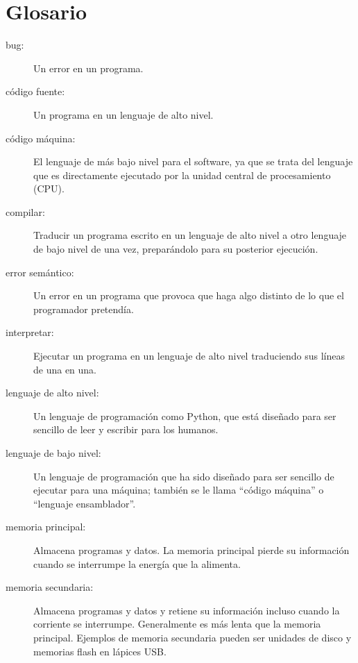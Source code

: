 \section{Glosario}

\begin{description}

\item[bug:] Un error en un programa.

\item[código fuente:] Un programa en un lenguaje de alto nivel.

\item[código máquina:] El lenguaje de más bajo nivel para el software, ya que se trata
del lenguaje que es directamente ejecutado por la unidad central de procesamiento
(CPU).

\item[compilar:] Traducir un programa escrito en un lenguaje de alto nivel
a otro lenguaje de bajo nivel de una vez, preparándolo para su posterior
ejecución.

\item[error semántico:] Un error en un programa que provoca que haga algo
distinto de lo que el programador pretendía.

\item[interpretar:]  Ejecutar un programa en un lenguaje de alto nivel
traduciendo sus líneas de una en una.

\item[lenguaje de alto nivel:]  Un lenguaje de programación como Python, que
está diseñado para ser sencillo de leer y escribir para los humanos.

\item[lenguaje de bajo nivel:]  Un lenguaje de programación que ha sido diseñado
para ser sencillo de ejecutar para una máquina; también se le llama ``código máquina''
o ``lenguaje ensamblador''.

\item[memoria principal:] Almacena programas y datos. La memoria principal pierde
su información cuando se interrumpe la energía que la alimenta.

\item[memoria secundaria:] Almacena programas y datos y retiene su
información incluso cuando la corriente se interrumpe. Generalmente es más lenta
que la memoria principal. Ejemplos de memoria secundaria pueden ser unidades de
disco y memorias flash en lápices USB.


\end{description}
